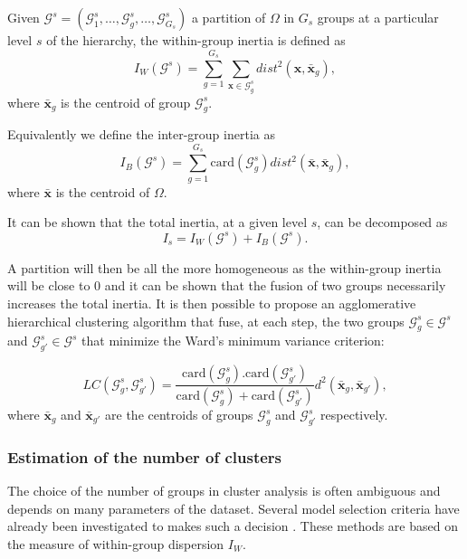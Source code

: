 \documentclass[]{book}
\begin{document}
Given \(\mathcal{G}^s= (\mathcal{G}^s_1, \dots, \mathcal{G}^s_g, \dots, \mathcal{G}^s_{G_s})\) a
partition of \(\Omega\) in \(G_s\) groups at a particular level \(s\) of the
hierarchy, the within-group inertia is defined as
\[I_W (\mathcal{G}^s) = \sum_{g=1}^{G_s} \sum_{\boldsymbol{x} \in \mathcal{G}^s_g} dist^2(\boldsymbol{x}, \bar{\boldsymbol{x}}_g),\]
where \(\bar{\boldsymbol{x}}_g\) is the centroid of group \(\mathcal{G}^s_g\).

Equivalently we define the inter-group inertia as
\[I_B(\mathcal{G}^s) = \sum_{g=1}^{G_s} \text{card}(\mathcal{G}^s_g) dist^2(\bar{\boldsymbol{x}}, \bar{\boldsymbol{x}}_g),\]
where \(\bar{\boldsymbol{x}}\) is the centroid of \(\Omega\).

It can be shown that the total inertia, at a given level \(s\), can be
decomposed as \[I_s = I_W (\mathcal{G}^s) + I_B(\mathcal{G}^s).\]

A partition will then be all the more homogeneous as the within-group
inertia will be close to 0 and it can be shown that the fusion of two
groups necessarily increases the total inertia. It is then possible to
propose an agglomerative hierarchical clustering algorithm that fuse, at
each step, the two groups \(\mathcal{G}^s_g \in \mathcal{G}^s\) and
\(\mathcal{G}^s_{g'} \in \mathcal{G}^s\) that minimize the Ward's minimum variance
criterion:

\[LC( \mathcal{G}^s_g,  \mathcal{G}^s_{g'}) = \frac{\text{card}( \mathcal{G}^s_g).\text{card}( \mathcal{G}^s_{g'})}{\text{card}( \mathcal{G}^s_g) + \text{card}( \mathcal{G}^s_{g'})} d^2(\bar{\boldsymbol{x}}_g, \bar{\boldsymbol{x}}_{g'}),\]
where \(\bar{\boldsymbol{x}}_g\) and \(\bar{\boldsymbol{x}}_{g'}\) are the centroids of groups
\(\mathcal{G}^s_g\) and \(\mathcal{G}^s_{g'}\) respectively.

\hypertarget{estimation-of-the-number-of-clusters}{%
\subsubsection*{Estimation of the number of clusters}\label{estimation-of-the-number-of-clusters}}

The choice of the number of groups in cluster analysis is often
ambiguous and depends on many parameters of the dataset. Several model
selection criteria have already been investigated to makes such a
decision
\citep{tibshirani_estimating_2001, calinski_dendrite_1974, krzanowski_criterion_1988}.
These methods are based on the measure of within-group dispersion \(I_W\).
\end{document}

